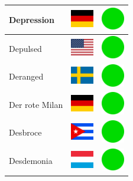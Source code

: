 \documentclass[12pt, a4paper, twoside]{report}
\begin{document}
\begin{center}
\begin{longtable}{|p{5cm}|p{2cm}|p{2cm}|}
Depression & \includegraphics[width=1cm]{4x3/de} & \includegraphics[width=1cm]{likes/y} \\ \hline
Depulsed & \includegraphics[width=1cm]{4x3/us} & \includegraphics[width=1cm]{likes/y} \\ \hline
Deranged & \includegraphics[width=1cm]{4x3/se} & \includegraphics[width=1cm]{likes/y} \\ \hline
Der rote Milan & \includegraphics[width=1cm]{4x3/de} & \includegraphics[width=1cm]{likes/y} \\ \hline
Desbroce & \includegraphics[width=1cm]{4x3/cu} & \includegraphics[width=1cm]{likes/y} \\ \hline
Desdemonia & \includegraphics[width=1cm]{4x3/lu} & \includegraphics[width=1cm]{likes/y} \\ \hline

\end{longtable}
\end{center}
\end{document}
